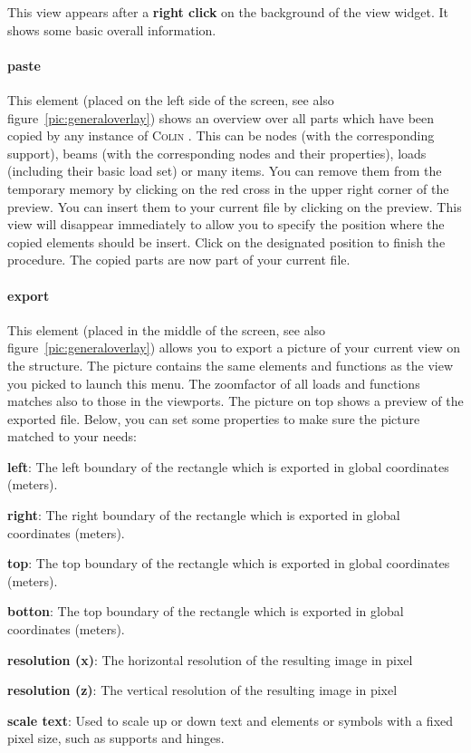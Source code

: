 \documentclass[a4paper,11pt]{report}
\newcommand{\Colin}[0]{\textsc{Colin }}
\begin{document}
This view appears after a \textbf{right click} on the background of the view widget. It shows some basic overall information. 

\paragraph{paste}
This element (placed on the left side of the screen, see also figure~\ref{pic:generaloverlay}) shows an overview over all parts which have been copied by any instance of \Colin. This can be nodes (with the corresponding support), beams (with the corresponding nodes and their properties), loads (including their basic load set) or many items. You can remove them from the temporary memory by clicking on the red cross in the upper right corner of the preview. You can insert them to your current file by clicking on the preview. This view will disappear immediately to allow you to specify the position where the copied elements should be insert. Click on the designated position to finish the procedure. The copied parts are now part of your current file. 

\paragraph{export}
This element (placed in the middle of the screen, see also figure~\ref{pic:generaloverlay}) allows you to export a picture of your current view on the structure. The picture contains the same elements and functions as the view you picked to launch this menu. The zoomfactor of all loads and functions matches also to those in the viewports.
The picture on top shows a preview of the exported file. Below, you can set some properties to make sure the picture matched to your needs:
\begin{trivlist}
	\leftskip=1cm
	\item[]\textbf{left}: The left boundary of the rectangle which is exported in global coordinates (meters).
	\item[]\textbf{right}: The right boundary of the rectangle which is exported in global coordinates (meters).
	\item[]\textbf{top}: The top boundary of the rectangle which is exported in global coordinates (meters).
	\item[]\textbf{botton}: The top boundary of the rectangle which is exported in global coordinates (meters).
	\item[]\textbf{resolution (x)}: The horizontal resolution of the resulting image in pixel
	\item[]\textbf{resolution (z)}: The vertical resolution of the resulting image in pixel
	\item[]\textbf{scale text}: Used to scale up or down text and elements or symbols with a fixed pixel size, such as supports and hinges.
\end{trivlist}
\end{document}
